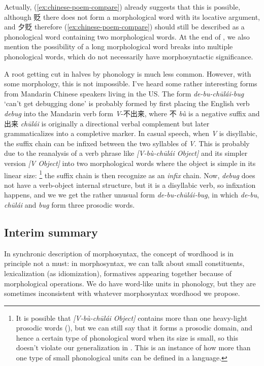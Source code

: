 \documentclass[a4paper, oneside, scheme=plain, 12pt]{article}
\newcommand{\form}[1]{\emph{#1}}
\newcommand{\translate}[1]{`#1'}
\begin{document}
Actually, (\ref{ex:chinese-poem-compare}) already suggests that this is possible,
although 贬 there does not form a morphological word with its locative argument,
and 夕贬 therefore (\ref{ex:chinese-poem-compare}) should still be described as
a phonological word containing two morphological words.
At the end of ,
we also mention the possibility of a long morphological word breaks into multiple phonological words,
which do not necessarily have morphosyntactic significance.

A root getting cut in halves by phonology is much less common.
However, with some morphology, this is not impossible.
I've heard some rather interesting forms from Mandarin Chinese speakers living in the US.
The form \form{de-bu-chūlái-bug} \translate{can't get debugging done}
is probably formed by first placing the English verb \form{debug}
into the Mandarin verb form \form{V}-不出来,
where 不 \form{bù} is a negative suffix and 出来 \form{chūlái} is originally a directional verbal complement
but later grammaticalizes into a completive marker.
In casual speech, when \form{V} is disyllabic,
the suffix chain can be infixed between the two syllables of \form{V}.
This is probably due to the reanalysis of a verb phrase like \form{[V-bù-chūlái Object]}
and its simpler version \form{[V Object]} into two morphological words
where the object is simple in its linear size:%
\footnote{
    It is possible that \form{[V-bù-chūlái Object]} contains more than one heavy-light prosodic words
    (),
    but we can still say that it forms a prosodic domain,
    and hence a certain type of phonological word when its size is small,
    so this doesn't violate our generalization in .
    This is an instance of how more than one type of small phonological units can be defined in a language.
}
the suffix chain is then recognize as an \emph{infix} chain.
Now, \form{debug} does not have a verb-object internal structure,
but it is a disyllabic verb, so infixation happens,
and we we get the rather unusual form \form{de-bu-chūlái-bug},
in which \form{de-bu}, \form{chūlái} and \form{bug} form three prosodic words.

\subsection{Interim summary}\label{sec:all-wordhood}

In synchronic description of morphosyntax,
the concept of wordhood is in principle not a must:
in morphosyntax, we can talk about small constituents, lexicalization (as idiomization),
formatives appearing together because of morphological operations.
We do have word-like units in phonology,
but they are sometimes inconsistent with whatever morphosyntax wordhood we propose.
\end{document}
